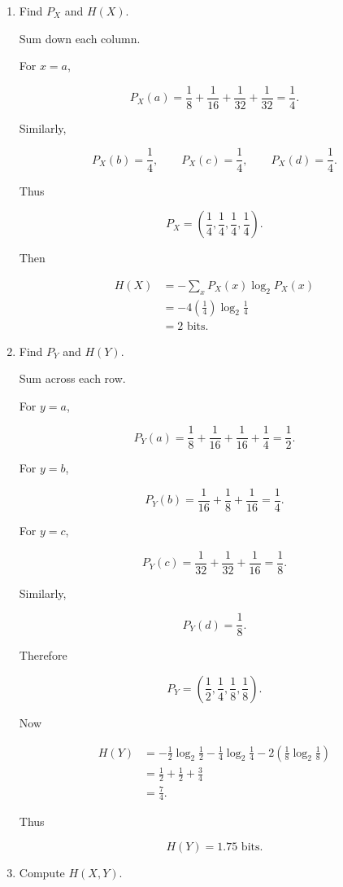 \documentclass[11pt]{article}
\begin{document}
\begin{enumerate}

\item Find \(P_X\) and \(H(X)\).

Sum down each column.

For \(x=a\),

\[
P_X(a)
=
\frac18+\frac1{16}+\frac1{32}+\frac1{32}
=
\frac14.
\]

Similarly,

\[
P_X(b)=\frac14,
\qquad
P_X(c)=\frac14,
\qquad
P_X(d)=\frac14.
\]

Thus

\[
P_X
=
\left(
\frac14,\frac14,\frac14,\frac14
\right).
\]

Then

\begin{align*}
H(X)
&=
-\sum_xP_X(x)\log_2P_X(x) \\
&=
-4\left(\frac14\right)\log_2\frac14 \\
&=
2\text{ bits}.
\end{align*}

\item Find \(P_Y\) and \(H(Y)\).

Sum across each row.

For \(y=a\),

\[
P_Y(a)
=
\frac18+\frac1{16}+\frac1{16}+\frac14
=
\frac12.
\]

For \(y=b\),

\[
P_Y(b)
=
\frac1{16}+\frac18+\frac1{16}
=
\frac14.
\]

For \(y=c\),

\[
P_Y(c)
=
\frac1{32}+\frac1{32}+\frac1{16}
=
\frac18.
\]

Similarly,

\[
P_Y(d)=\frac18.
\]

Therefore

\[
P_Y
=
\left(
\frac12,\frac14,\frac18,\frac18
\right).
\]

Now

\begin{align*}
H(Y)
&=
-\frac12\log_2\frac12
-\frac14\log_2\frac14
-2\left(\frac18\log_2\frac18\right) \\
&=
\frac12+\frac12+\frac34 \\
&=
\frac74.
\end{align*}

Thus

\[
H(Y)=1.75\text{ bits}.
\]

\item Compute \(H(X,Y)\).


\end{enumerate}
\end{document}
